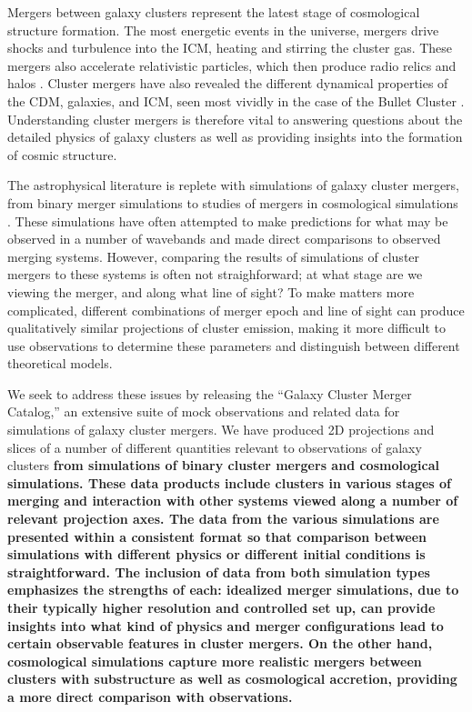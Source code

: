 \documentclass{emulateapj}
\begin{document}
Mergers between galaxy clusters represent the latest stage of cosmological structure formation. The most energetic events in the universe, mergers drive shocks and turbulence into the ICM, heating and stirring the cluster gas. These mergers also accelerate relativistic particles, which then produce radio relics and halos \citep{fer05,bru07,vwe10,bru12}. Cluster mergers have also revealed the different dynamical properties of the CDM, galaxies, and ICM, seen most vividly in the case of the Bullet Cluster \citep[][]{clo04,mar04}. Understanding cluster mergers is therefore vital to answering questions about the detailed physics of galaxy clusters as well as providing insights into the formation of cosmic structure.

The astrophysical literature is replete with simulations of galaxy cluster mergers, from binary merger simulations \citep[e.g.][]{ric01,poo06,zuh11,don13} to studies of mergers in cosmological simulations \citep[e.g.][]{vaz09,ski13,yu15}. These simulations have often attempted to make predictions for what may be observed in a number of wavebands and made direct comparisons to observed merging systems. However, comparing the results of simulations of cluster mergers to these systems is often not straighforward; at what stage are we viewing the merger, and along what line of sight? To make matters more complicated, different combinations of merger epoch and line of sight can produce qualitatively similar projections of cluster emission, making it more difficult to use observations to determine these parameters and distinguish between different theoretical models.

We seek to address these issues by releasing the ``Galaxy Cluster Merger Catalog,'' an extensive suite of mock observations and related data for simulations of galaxy cluster mergers. We have produced 2D projections and slices of a number of different quantities relevant to observations of galaxy clusters {\bf from simulations of binary cluster mergers and cosmological simulations. {\bf These data products include clusters in various stages of merging and interaction with other systems viewed along a number of relevant projection axes. The data from the various simulations are presented within a consistent format so that comparison between simulations with different physics or different initial conditions is straightforward.} The inclusion of data from both simulation types emphasizes the strengths of each: idealized merger simulations, due to their typically higher resolution and controlled set up, can provide insights into what kind of physics and merger configurations lead to certain observable features in cluster mergers. On the other hand, cosmological simulations capture more realistic mergers between clusters with substructure as well as cosmological accretion, providing a more direct comparison with observations.}
\end{document}
